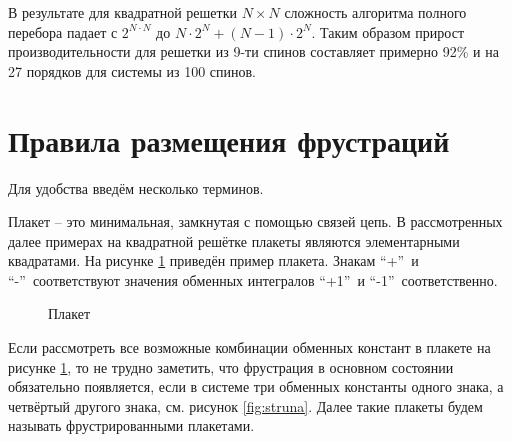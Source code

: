 \documentclass[utf8, babel, sor, jor, amsmath, amssymb, reprint]{elsarticle} %
\begin{document}
В результате для квадратной решетки $N \times N$ сложность алгоритма полного перебора падает с $2^{N \cdot N}$ до $N \cdot 2^N + (N - 1) \cdot 2^N$. Таким образом прирост производительности для решетки из 9-ти спинов составляет примерно 92\% и на 27 порядков для системы из 100 спинов.


\section{Правила размещения фрустраций}

Для удобства введём несколько терминов.

 Плакет – это минимальная, замкнутая с помощью связей цепь. В рассмотренных далее примерах на квадратной решётке плакеты являются элементарными квадратами. На рисунке \ref{fig:petlya} приведён пример плакета. Знакам \textquotedblleft +\textquotedblright ~и   \textquotedblleft -\textquotedblright ~соответствуют значения обменных интегралов  \textquotedblleft +1\textquotedblright ~и \textquotedblleft -1\textquotedblright ~соответственно.

\begin{figure}[H]
	\centering
	\begin{minipage}{0.3\textwidth}
		\centering
		\caption{Плакет}
		\label{fig:petlya}
	\end{minipage}
\end{figure}
Если рассмотреть все возможные комбинации обменных констант в плакете на рисунке \ref{fig:petlya}, то не трудно заметить, что фрустрация в основном состоянии обязательно появляется, если в системе три обменных константы одного знака, а четвёртый другого знака, см. рисунок \ref{fig:struna}. Далее такие плакеты будем называть фрустрированными плакетами.
\end{document}
